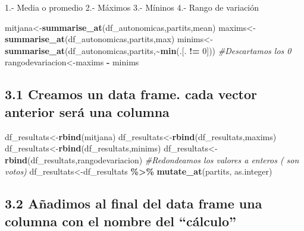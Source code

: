 \documentclass[
]{article}
\newenvironment{Shaded}{\begin{snugshade}}{\end{snugshade}}
\newcommand{\CommentTok}[1]{\textcolor[rgb]{0.56,0.35,0.01}{\textit{#1}}}
\newcommand{\DecValTok}[1]{\textcolor[rgb]{0.00,0.00,0.81}{#1}}
\newcommand{\FunctionTok}[1]{\textcolor[rgb]{0.13,0.29,0.53}{\textbf{#1}}}
\newcommand{\NormalTok}[1]{#1}
\newcommand{\OtherTok}[1]{\textcolor[rgb]{0.56,0.35,0.01}{#1}}
\newcommand{\SpecialCharTok}[1]{\textcolor[rgb]{0.81,0.36,0.00}{\textbf{#1}}}
\begin{document}
1.- Media o promedio 2.- Máximos 3.- Míninos 4.- Rango de variación

\begin{Shaded}
\begin{Highlighting}[]
\NormalTok{mitjana}\OtherTok{\textless{}{-}}\FunctionTok{summarise\_at}\NormalTok{(df\_autonomicas,partits,mean)}
\NormalTok{maxims}\OtherTok{\textless{}{-}}\FunctionTok{summarise\_at}\NormalTok{(df\_autonomicas,partits,max)}
\NormalTok{minims}\OtherTok{\textless{}{-}}\FunctionTok{summarise\_at}\NormalTok{(df\_autonomicas,partits,}\SpecialCharTok{\textasciitilde{}}\FunctionTok{min}\NormalTok{(.[. }\SpecialCharTok{!=} \DecValTok{0}\NormalTok{])) }\CommentTok{\#Descartamos los 0}
\NormalTok{rangodevariacion}\OtherTok{\textless{}{-}}\NormalTok{maxims }\SpecialCharTok{{-}}\NormalTok{ minims}
\end{Highlighting}
\end{Shaded}

\hypertarget{creamos-un-data-frame.-cada-vector-anterior-seruxe1-una-columna}{%
\subsection{3.1 Creamos un data frame. cada vector anterior será una
columna}\label{creamos-un-data-frame.-cada-vector-anterior-seruxe1-una-columna}}

\begin{Shaded}
\begin{Highlighting}[]
\NormalTok{df\_resultats}\OtherTok{\textless{}{-}}\FunctionTok{rbind}\NormalTok{(mitjana)}
\NormalTok{df\_resultats}\OtherTok{\textless{}{-}}\FunctionTok{rbind}\NormalTok{(df\_resultats,maxims)}
\NormalTok{df\_resultats}\OtherTok{\textless{}{-}}\FunctionTok{rbind}\NormalTok{(df\_resultats,minims)}
\NormalTok{df\_resultats}\OtherTok{\textless{}{-}}\FunctionTok{rbind}\NormalTok{(df\_resultats,rangodevariacion)}
\CommentTok{\#Redondeamos los valores a enteros ( son votos) }
\NormalTok{df\_resultats}\OtherTok{\textless{}{-}}\NormalTok{df\_resultats }\SpecialCharTok{\%\textgreater{}\%} \FunctionTok{mutate\_at}\NormalTok{(partits, as.integer)}
\end{Highlighting}
\end{Shaded}

\hypertarget{auxf1adimos-al-final-del-data-frame-una-columna-con-el-nombre-del-cuxe1lculo}{%
\subsection{3.2 Añadimos al final del data frame una columna con el
nombre del
``cálculo''}\label{auxf1adimos-al-final-del-data-frame-una-columna-con-el-nombre-del-cuxe1lculo}}
\end{document}
